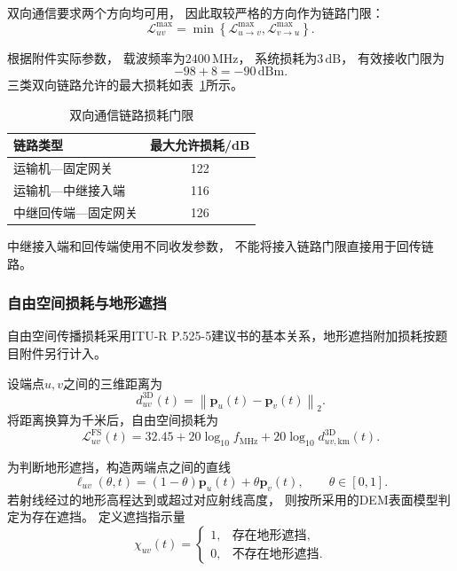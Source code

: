 \documentclass[bwprint]{gmcmthesis}
\begin{document}
双向通信要求两个方向均可用，
因此取较严格的方向作为链路门限：
\begin{equation}
    \mathcal{L}_{uv}^{\max}
    =
    \min\left\{
    \mathcal{L}_{u\to v}^{\max},
    \mathcal{L}_{v\to u}^{\max}
    \right\}.
    \label{eq:q3_bidirectional_budget}
\end{equation}

根据附件实际参数，
载波频率为$2400\,\mathrm{MHz}$，
系统损耗为$3\,\mathrm{dB}$，
有效接收门限为
\begin{equation}
    -98+8=-90\,\mathrm{dBm}.
\end{equation}
三类双向链路允许的最大损耗如表~\ref{tab:q3_link_budget}所示。

\begin{table}[htbp]
    \centering
    \caption{双向通信链路损耗门限}
    \label{tab:q3_link_budget}
    \begin{tabular}{lc}
        \toprule
        链路类型 & 最大允许损耗/dB \\
        \midrule
        运输机—固定网关 & 122 \\
        运输机—中继接入端 & 116 \\
        中继回传端—固定网关 & 126 \\
        \bottomrule
    \end{tabular}
\end{table}

中继接入端和回传端使用不同收发参数，
不能将接入链路门限直接用于回传链路。

\subsubsection{自由空间损耗与地形遮挡}
自由空间传播损耗采用ITU-R P.525-5建议书的基本关系\cite{itu2024}，地形遮挡附加损耗按题目附件另行计入。


设端点$u,v$之间的三维距离为
\begin{equation}
    d_{uv}^{\mathrm{3D}}(t)
    =
    \left\|
    \boldsymbol{p}_u(t)-\boldsymbol{p}_v(t)
    \right\|_2.
\end{equation}
将距离换算为千米后，自由空间损耗为
\begin{equation}
    \mathcal{L}_{uv}^{\mathrm{FS}}(t)
    =
    32.45
    +20\log_{10}f_{\mathrm{MHz}}
    +20\log_{10}d_{uv,\mathrm{km}}^{\mathrm{3D}}(t).
    \label{eq:q3_fspl}
\end{equation}

为判断地形遮挡，构造两端点之间的直线
\begin{equation}
    \boldsymbol{\ell}_{uv}(\theta,t)
    =
    (1-\theta)\boldsymbol{p}_u(t)
    +\theta\boldsymbol{p}_v(t),
    \qquad \theta\in[0,1].
\end{equation}
若射线经过的地形高程达到或超过对应射线高度，
则按所采用的DEM表面模型判定为存在遮挡。
定义遮挡指示量
\begin{equation}
    \chi_{uv}(t)
    =
    \begin{cases}
        1,&\text{存在地形遮挡},\\
        0,&\text{不存在地形遮挡}.
    \end{cases}
\end{equation}
\end{document}

